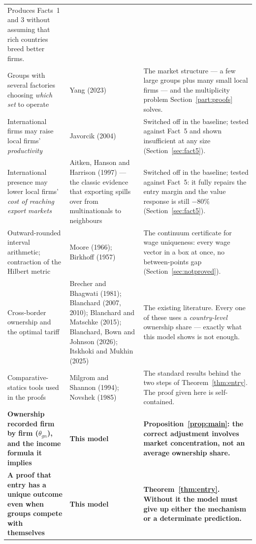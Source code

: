 \documentclass[11pt]{article}
\theoremstyle{plain}
\theoremstyle{remark}
\theoremstyle{definition}
\begin{document}
\begin{center}
\begin{longtable}{p{4.1cm}p{4.5cm}p{5.8cm}}
Produces Facts~1 and 3 without assuming that rich countries breed better firms.\\
\addlinespace
Groups with several factories choosing \emph{which set} to operate &
Yang (2023) &
The market structure --- a few large groups plus many small local firms --- and the
multiplicity problem Section~\ref{part:proofs} solves.\\
\addlinespace
International firms may raise local firms' \emph{productivity} &
Javorcik (2004) &
Switched off in the baseline; tested against Fact~5 and shown insufficient at any
size (Section~\ref{sec:fact5}).\\
\addlinespace
International presence may lower local firms' \emph{cost of reaching export markets} &
Aitken, Hanson and Harrison (1997) --- the classic evidence that exporting spills over
from multinationals to neighbours &
Switched off in the baseline; tested against Fact~5: it fully repairs the entry margin
and the value response is still $-80\%$ (Section~\ref{sec:fact5}).\\
\addlinespace
Outward-rounded interval arithmetic; contraction of the Hilbert metric &
Moore (1966); Birkhoff (1957) &
The continuum certificate for wage uniqueness: every wage vector in a box at once,
no between-points gap (Section~\ref{sec:notproved}).\\
\addlinespace
Cross-border ownership and the optimal tariff &
Brecher and Bhagwati (1981); Blanchard (2007, 2010); Blanchard and Matschke (2015);
Blanchard, Bown and Johnson (2026); Itskhoki and Mukhin (2025) &
The existing literature. Every one of these uses a \emph{country-level} ownership
share --- exactly what this model shows is not enough.\\
\addlinespace
Comparative-statics tools used in the proofs &
Milgrom and Shannon (1994); Novshek (1985) &
The standard results behind the two steps of Theorem~\ref{thm:entry}. The proof given
here is self-contained.\\
\midrule
\textbf{Ownership recorded firm by firm ($\theta_{gn}$), and the income formula it
implies} &
\textbf{This model} &
\textbf{Proposition~\ref{prop:main}: the correct adjustment involves market
concentration, not an average ownership share.}\\
\addlinespace
\textbf{A proof that entry has a unique outcome even when groups compete with
themselves} &
\textbf{This model} &
\textbf{Theorem~\ref{thm:entry}. Without it the model must give up either the
mechanism or a determinate prediction.}\\
\bottomrule
\end{longtable}
\end{center}
\end{document}
